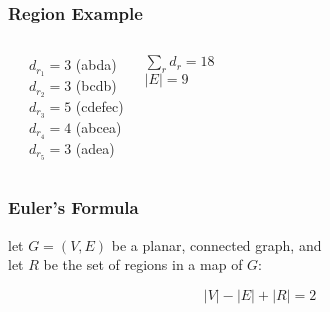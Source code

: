 \documentclass[dvipsnames]{beamer}
\begin{document}
\begin{frame}
  \frametitle{Region Example}

  \begin{example}
    \begin{columns}
      \begin{center}
      \end{center}

      $d_{r_1} = 3$ (abda)\\
      $d_{r_2} = 3$ (bcdb)\\
      $d_{r_3} = 5$ (cdefec)\\
      $d_{r_4} = 4$ (abcea)\\
      $d_{r_5} = 3$ (adea)

      \medskip
      $\sum_r d_r = 18$\\
      $|E| = 9$
    \end{columns}
  \end{example}
\end{frame}

\begin{frame}
  \frametitle{Euler's Formula}

  \begin{theorem}
    let $G=(V,E)$ be a planar, connected graph, and\\
    let $R$ be the set of regions in a map of $G$:

    \[|V| - |E| + |R| = 2\]
  \end{theorem}
\end{frame}
\end{document}
